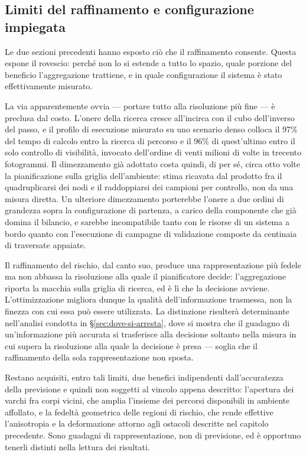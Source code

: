 \subsection{Limiti del raffinamento e configurazione impiegata}
\label{sec:limiti-raffinamento}

Le due sezioni precedenti hanno esposto ciò che il raffinamento consente. Questa espone il
rovescio: perché non lo si estende a tutto lo spazio, quale porzione del beneficio
l'aggregazione trattiene, e in quale configurazione il sistema è stato effettivamente misurato.

La via apparentemente ovvia — portare tutto alla risoluzione più fine — è preclusa dal costo.
L'onere della ricerca cresce all'incirca con il cubo dell'inverso del passo, e il profilo di
esecuzione misurato su uno scenario denso colloca il 97\% del tempo di calcolo entro la ricerca
di percorso e il 96\% di quest'ultimo entro il solo controllo di visibilità, invocato
dell'ordine di venti milioni di volte in trecento fotogrammi. Il dimezzamento già adottato costa
quindi, di per sé, circa otto volte la pianificazione sulla griglia dell'ambiente: stima
ricavata dal prodotto fra il quadruplicarsi dei nodi e il raddoppiarsi dei campioni per
controllo, non da una misura diretta. Un ulteriore dimezzamento porterebbe l'onere a due ordini
di grandezza sopra la configurazione di partenza, a carico della componente che già domina il
bilancio, e sarebbe incompatibile tanto con le risorse di un sistema a bordo quanto con
l'esecuzione di campagne di validazione composte da centinaia di traversate appaiate.

Il raffinamento del rischio, dal canto suo, produce una rappresentazione più fedele ma non
abbassa la risoluzione alla quale il pianificatore decide: l'aggregazione riporta la macchia
sulla griglia di ricerca, ed è lì che la decisione avviene.
L'ottimizzazione migliora dunque la qualità dell'informazione trasmessa, non la finezza con cui
essa può essere utilizzata. La distinzione risulterà determinante nell'analisi condotta in
\S\ref{sec:dove-si-arresta}, dove si mostra che il guadagno di un'informazione più accurata si
trasferisce alla decisione soltanto nella misura in cui supera la risoluzione alla quale la
decisione è presa — soglia che il raffinamento della sola rappresentazione non sposta.

Restano acquisiti, entro tali limiti, due benefici indipendenti dall'accuratezza della
previsione e quindi non soggetti al vincolo appena descritto: l'apertura dei varchi fra corpi
vicini, che amplia l'insieme dei percorsi disponibili in ambiente affollato, e la fedeltà
geometrica delle regioni di rischio, che rende effettive l'anisotropia e la deformazione
attorno agli ostacoli descritte nel capitolo precedente. Sono guadagni di rappresentazione, non di
previsione, ed è opportuno tenerli distinti nella lettura dei risultati.

